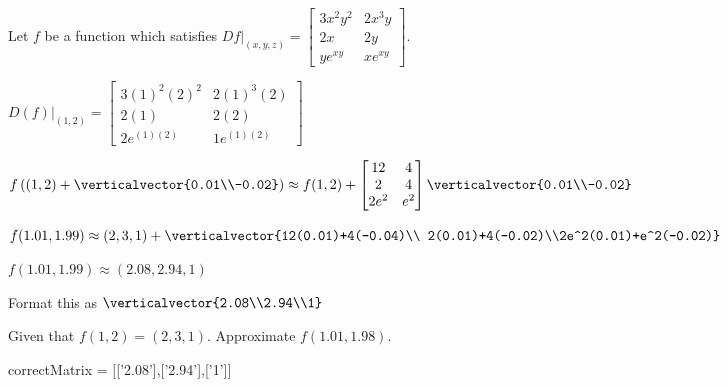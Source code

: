 \documentclass{ximera}
\begin{document}
\begin{question} 
	Let $f$ be a function which satisfies $Df\big|_{(x,y,z)} = \begin{bmatrix} 3x^2y^2 & 2x^3y\\ 2x&2y\\ye^{xy} & xe^{xy}\end{bmatrix}$.
	
		\begin{solution}
			\begin{hint}
				\(D(f)\big|_{(1,2)} = \begin{bmatrix} 3(1)^2(2)^2 & 2(1)^3(2)\\ 2(1) & 2(2) \\ 2e^{(1)(2)} & 1e^{(1)(2)}\end{bmatrix}\)
			\end{hint}
			\begin{hint}
				\( f\left((1,2)+ \verticalvector{0.01\\-0.02}\right)\approx f(1,2) + 
				\begin{bmatrix} 12 & 4\\2 & 4 \\ 2e^{2} & e^{2}\end{bmatrix} \verticalvector{0.01\\-0.02}\)
			\end{hint}
			\begin{hint}
				\( f(1.01,1.99) \approx (2,3,1)+ \verticalvector{12(0.01)+4(-0.04)\\ 2(0.01)+4(-0.02)\\2e^2(0.01)+e^2(-0.02)}\)
			\end{hint}
			\begin{hint}
				\( f(1.01,1.99) \approx (2.08,2.94,1)\)
			\end{hint}
			\begin{hint}
				Format this as $\verticalvector{2.08\\2.94\\1}$
			\end{hint}
			Given that \(f(1,2) = (2,3,1)\).  Approximate \(f(1.01,1.98)\).  
			\begin{matrix-answer}
				correctMatrix = [['2.08'],['2.94'],['1']]
			\end{matrix-answer}
		\end{solution}
\end{question}




	
\end{document}
